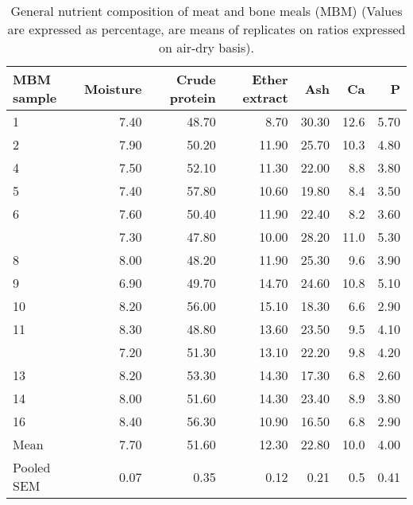 \documentclass[
]{article}
\begin{document}
\begin{longtable}[t]{lrrrrrr}
\caption{\label{tab:crude-compounds-mbm}General nutrient composition of meat and bone meals (MBM) (Values are expressed as percentage, are means of replicates on ratios expressed on air-dry basis).}\\
\toprule
MBM sample & Moisture & Crude protein & Ether extract & Ash & Ca & P\\
\midrule
1 & 7.40 & 48.70 & 8.70 & 30.30 & 12.6 & 5.70\\
2 & 7.90 & 50.20 & 11.90 & 25.70 & 10.3 & 4.80\\
4 & 7.50 & 52.10 & 11.30 & 22.00 & 8.8 & 3.80\\
5 & 7.40 & 57.80 & 10.60 & 19.80 & 8.4 & 3.50\\
6 & 7.60 & 50.40 & 11.90 & 22.40 & 8.2 & 3.60\\
\addlinespace
7 & 7.30 & 47.80 & 10.00 & 28.20 & 11.0 & 5.30\\
8 & 8.00 & 48.20 & 11.90 & 25.30 & 9.6 & 3.90\\
9 & 6.90 & 49.70 & 14.70 & 24.60 & 10.8 & 5.10\\
10 & 8.20 & 56.00 & 15.10 & 18.30 & 6.6 & 2.90\\
11 & 8.30 & 48.80 & 13.60 & 23.50 & 9.5 & 4.10\\
\addlinespace
12 & 7.20 & 51.30 & 13.10 & 22.20 & 9.8 & 4.20\\
13 & 8.20 & 53.30 & 14.30 & 17.30 & 6.8 & 2.60\\
14 & 8.00 & 51.60 & 14.30 & 23.40 & 8.9 & 3.80\\
16 & 8.40 & 56.30 & 10.90 & 16.50 & 6.8 & 2.90\\
Mean & 7.70 & 51.60 & 12.30 & 22.80 & 10.0 & 4.00\\
\addlinespace
Pooled SEM & 0.07 & 0.35 & 0.12 & 0.21 & 0.5 & 0.41\\
\bottomrule
\end{longtable}
\end{document}
